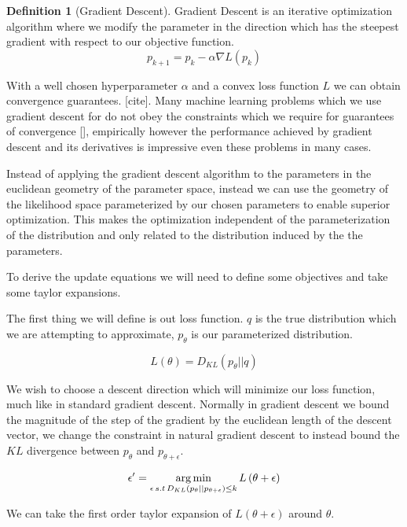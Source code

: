 \documentclass[12pt, a4paper]{report}
\theoremstyle{definition}
\theoremstyle{definition}
\newtheorem{definition}{Definition}[section]
\theoremstyle{definition}
\begin{document}
\begin{definition}[Gradient Descent]
    Gradient Descent is an iterative optimization algorithm where we modify the parameter in the direction which has the steepest gradient with respect to our objective function.
    $$p_{k+1} = p_{k} -  \alpha \nabla L(p_k)$$
\end{definition}

With a well chosen hyperparameter $\alpha$ and a convex loss function $L$ we can obtain convergence guarantees. [cite]. Many machine learning problems which we use gradient descent for do not obey the constraints which we require for guarantees of convergence [], empirically however the performance achieved by gradient descent and its derivatives is impressive even these problems in many cases.

Instead of applying the gradient descent algorithm to the parameters in the euclidean geometry of the parameter space, instead we can use the geometry of the likelihood space parameterized by our chosen parameters to enable superior optimization. This makes the optimization independent of the parameterization of the distribution and only related to the distribution induced by the the parameters.
 
To derive the update equations we will need to define some objectives and take some taylor expansions.

The first thing we will define is out loss function. $q$ is the true distribution which we are attempting to approximate, $p_\theta$ is our parameterized distribution.

$$L \left(\theta \right) = D_{KL} \left(p_\theta || q \right) $$

We wish to choose a descent direction which will minimize our loss function, much like in standard gradient descent. Normally in gradient descent we bound the magnitude of the step of the gradient by the euclidean length of the descent vector, we change the constraint in natural gradient descent to instead bound the $KL$ divergence between $p_\theta$ and $p_{\theta + \epsilon}$.

\begin{align}
    \epsilon^\prime &= \operatorname*{arg\,min}_{\epsilon \, s.t \, D_{KL} \left(p_\theta || p_{\theta + \epsilon} \right) \leq k} L \left( \theta + \epsilon \right) \\
\end{align}

We can take the first order taylor expansion of $L\left(\theta + \epsilon\right)$ around $\theta$.
\end{document}
